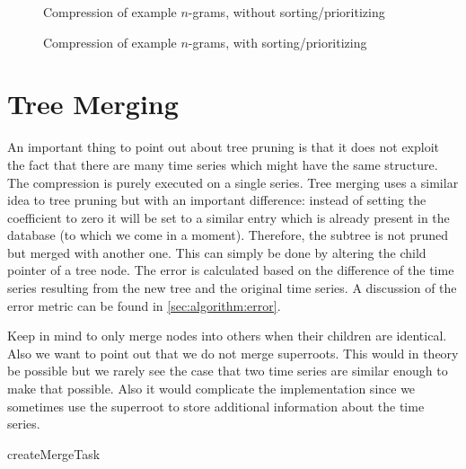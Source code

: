 \begin{figure}
    \centering
    
    \caption{Compression of example $n$-grams, without sorting\slash{}prioritizing}\label{fig:ngrams_ex2_compression_unsorted}
\end{figure}

\begin{figure}
    \centering
    
    \caption{Compression of example $n$-grams, with sorting\slash{}prioritizing}\label{fig:ngrams_ex2_compression_sorted}
\end{figure}



\section{Tree Merging}
\label{sec:algorithm:merge}

An important thing to point out about tree pruning is that it does not exploit the fact that there are many time series which might have the same structure. The compression is purely executed on a single series. Tree merging uses a similar idea to tree pruning but with an important difference: instead of setting the coefficient to zero it will be set to a similar entry which is already present in the database (to which we come in a moment). Therefore, the subtree is not pruned but merged with another one. This can simply be done by altering the child pointer of a tree node. The error is calculated based on the difference of the time series resulting from the new tree and the original time series. A discussion of the error metric can be found in \autoref{sec:algorithm:error}.

Keep in mind to only merge nodes into others when their children are identical. Also we want to point out that we do not merge superroots. This would in theory be possible but we rarely see the case that two time series are similar enough to make that possible. Also it would complicate the implementation since we sometimes use the superroot to store additional information about the time series.

\begin{algorithm}



    \caption{createMergeTask}\label{algo:createMergeTask}
\end{algorithm}

